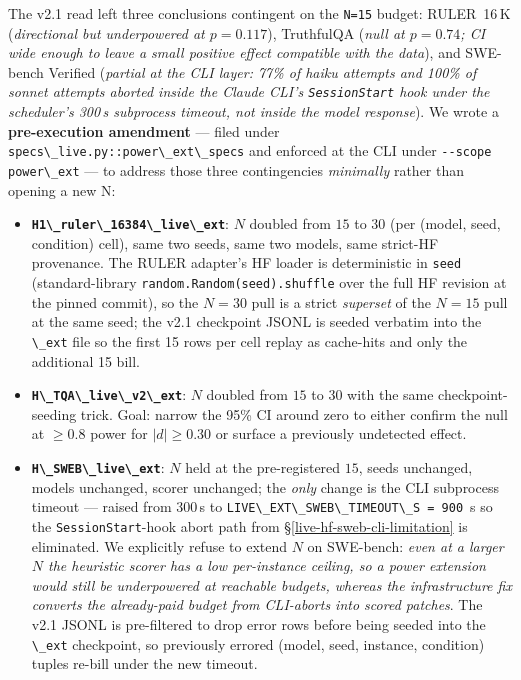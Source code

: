 The v2.1 read left three conclusions contingent on the
\passthrough{\lstinline!N=15!} budget: RULER~16\,K
(\emph{directional but underpowered at $p=0.117$}), TruthfulQA
(\emph{null at $p=0.74$; CI wide enough to leave a small positive
effect compatible with the data}), and SWE-bench Verified
(\emph{partial at the CLI layer: 77\% of haiku attempts and 100\% of
sonnet attempts aborted inside the Claude CLI's
\passthrough{\lstinline!SessionStart!} hook under the scheduler's
300\,s subprocess timeout, not inside the model response}). We wrote a
\textbf{pre-execution amendment} --- filed under
\passthrough{\lstinline!specs\_live.py::power\_ext\_specs!} and
enforced at the CLI under \passthrough{\lstinline!--scope power\_ext!}
--- to address those three contingencies \emph{minimally} rather than
opening a new N:

\begin{itemize}
\tightlist
\item \textbf{\passthrough{\lstinline!H1\_ruler\_16384\_live\_ext!}}:
  $N$ doubled from $15$ to $30$ (per (model, seed, condition) cell),
  same two seeds, same two models, same strict-HF provenance. The
  RULER adapter's HF loader is deterministic in \passthrough{\lstinline!seed!}
  (standard-library \passthrough{\lstinline!random.Random(seed).shuffle!} over
  the full HF revision at the pinned commit), so the $N=30$ pull is a
  strict \emph{superset} of the $N=15$ pull at the same seed; the v2.1
  checkpoint JSONL is seeded verbatim into the \passthrough{\lstinline!\_ext!}
  file so the first 15 rows per cell replay as cache-hits and only
  the additional 15 bill.
\item \textbf{\passthrough{\lstinline!H\_TQA\_live\_v2\_ext!}}: $N$
  doubled from $15$ to $30$ with the same checkpoint-seeding trick.
  Goal: narrow the 95\% CI around zero to either confirm the null
  at $\ge 0.8$ power for $|d|\ge 0.30$ or surface a previously
  undetected effect.
\item \textbf{\passthrough{\lstinline!H\_SWEB\_live\_ext!}}: $N$
  held at the pre-registered $15$, seeds unchanged, models
  unchanged, scorer unchanged; the \emph{only} change is the CLI
  subprocess timeout --- raised from 300\,s to
  \passthrough{\lstinline!LIVE\_EXT\_SWEB\_TIMEOUT\_S = 900!}~s
  so the \passthrough{\lstinline!SessionStart!}-hook abort path
  from \S\ref{live-hf-sweb-cli-limitation} is eliminated. We
  explicitly refuse to extend $N$ on SWE-bench: \emph{even at a
  larger $N$ the heuristic scorer has a low per-instance ceiling,
  so a power extension would still be underpowered at reachable
  budgets, whereas the infrastructure fix converts the already-paid
  budget from CLI-aborts into scored patches}. The v2.1 JSONL is
  pre-filtered to drop error rows before being seeded into the
  \passthrough{\lstinline!\_ext!} checkpoint, so previously errored
  (model, seed, instance, condition) tuples re-bill under the new
  timeout.
\end{itemize}

